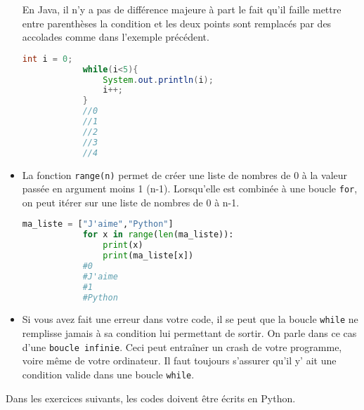 \begin{itemize}
     	En Java, il n'y a pas de différence majeure à part le fait qu'il faille mettre entre parenthèses la condition et les deux points sont remplacés par des accolades comme dans l'exemple précédent. \\
     	
     	\begin{lstlisting}[language=Java]
            int i = 0;
            while(i<5){
            	System.out.println(i);
            	i++;
            }
            //0
            //1
            //2
            //3
            //4
     	\end{lstlisting}
     	
     	
     	\item La fonction \lstinline{range(n)} permet de créer une liste de nombres de 0 à la valeur passée en argument moins 1 (n-1). Lorsqu’elle est combinée à une boucle \lstinline{for}, on peut itérer sur une liste de nombres de 0 à n-1. \\
     	
     	\begin{lstlisting}[language=Python]
         	ma_liste = ["J'aime","Python"]
      		for x in range(len(ma_liste)):
      			print(x)
           		print(ma_liste[x])
           	#0
           	#J'aime
           	#1
           	#Python
     	\end{lstlisting}
     	
     	\item Si vous avez fait une erreur dans votre code, il se peut que la boucle \lstinline{while} ne remplisse jamais à sa condition lui permettant de sortir. On parle dans ce cas d'une \lstinline{boucle infinie}. Ceci peut entraîner un crash de votre programme, voire même de votre ordinateur. Il faut toujours s'assurer qu'il y' ait une condition valide dans une boucle \lstinline{while}. \\
     	
     	\end{itemize}
     	
     	Dans les exercices suivants, les codes doivent être écrits en Python.
     	
